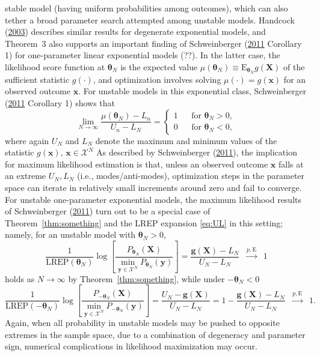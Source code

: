 \documentclass[12pt]{article}
\theoremstyle{definition}
\newcommand{\REP}{\mathrm{LREP}}
\begin{document}
{   stable model (having uniform probabilities among outcomes), which  can also  tether  a broad parameter search attempted  among     unstable models.     Handcock
(\protect\hyperlink{ref-handcock2003assessing}{2003}) describes similar results for degenerate exponential models, and  Theorem~3  also supports an important finding of
   Schweinberger
(\protect\hyperlink{ref-schweinberger2011instability}{2011} Corollary 1)
for one-parameter linear exponential models (??).  In the latter case, the likelihood score function  at $\boldsymbol \theta_N$ is the expected value  $\mu(\boldsymbol \theta_N)\equiv \mathrm{E}_{\boldsymbol \theta_N} g(\boldsymbol X)$  of the sufficient statistic $g(\cdot)$,   and optimization involves
solving $\mu(\cdot)=
 g(\boldsymbol x)$ for an observed outcome $\boldsymbol x$. For unstable  models in this exponential class,
  Schweinberger
(\protect\hyperlink{ref-schweinberger2011instability}{2011} Corollary 1)  shows
that
\[
\lim_{N\to \infty}\frac{\mu(\boldsymbol \theta_N) -L_n}{U_n-L_N}= \left\{ \begin{array}{lcl}
1 && \mbox{for $\boldsymbol \theta_N>0$},\\
0 && \mbox{for $\boldsymbol \theta_N<0$}, \end{array}\right.
\]
  where again $U_N$ and $L_N$ denote the maximum and minimum values of the statistic $g(\boldsymbol x)$, $\boldsymbol x\in\mathcal{X}^N$
       As described by Schweinberger
(\protect\hyperlink{ref-schweinberger2011instability}{2011}), the implication for maximum likelihood estimation   is that, unless an observed outcome $\boldsymbol x$ falls at an extreme $U_N, L_N$ (i.e., modes/anti-modes),
optimization steps in the parameter space can   iterate in  relatively small increments around zero and  fail to  converge.   For   unstable   one-parameter exponential models,
the maximum likelihood results of Schweinberger
(\protect\hyperlink{ref-schweinberger2011instability}{2011})   turn  out to be a special case of Theorem~\ref{thm:something}  and the LREP expansion \eqref{eq:UL} in this setting; namely,    for an unstable   model with $\boldsymbol \theta_N>0$,
   \[
\frac{1}{\REP(\boldsymbol \theta_N)} \log\left[ \frac{P_{\boldsymbol \theta_N }(\boldsymbol X) }{\displaystyle{\min_{\boldsymbol y\in\mathcal{X}^N}} P_{\boldsymbol \theta_N }(\boldsymbol y)}\right] = \frac{\boldsymbol g(\boldsymbol X) - L_N}{U_N-L_N}\;\;\stackrel{\mbox{$p, \mathrm{E}$}}{\longrightarrow}\;\; 1
\] holds as $N\to \infty$ by Theorem~\ref{thm:something}, while under   $-\boldsymbol \theta_N<0$
\[
\frac{1}{\REP(-\boldsymbol \theta_N)} \log\left[ \frac{P_{-\boldsymbol \theta_N }(\boldsymbol X) }{\displaystyle{\min_{\boldsymbol y\in\mathcal{X}^N}} P_{-\boldsymbol \theta_N }(\boldsymbol y)}\right] = \frac{U_N -\boldsymbol g(\boldsymbol X)}{U_N-L_N} = 1 - \frac{\boldsymbol g(\boldsymbol X) - L_N}{U_N-L_N} \;\;\stackrel{\mbox{$p, \mathrm{E}$}}{\longrightarrow}\;\; 1.
\]
Again, when all probability in  unstable models  may be
  pushed to opposite extremes in the sample space, due to a combination of degeneracy and
parameter sign,  numerical complications in
likelihood maximization may occur.



}
\end{document}
